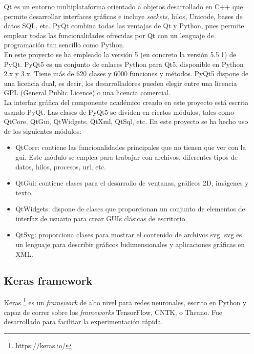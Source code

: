 Qt es un entorno multiplataforma orientado a objetos desarrollado en C++ que permite desarrollar interfaces gráficas e incluye \textit{sockets}, hilos, Unicode, bases de datos SQL, etc. PyQt combina todas las ventajas de Qt y Python, pues permite emplear todas las funcionalidades ofrecidas por Qt con un lenguaje de programación tan sencillo como Python.\\

En este proyecto se ha empleado la versión 5 (en concreto la versión 5.5.1) de PyQt. PyQt5 es un conjunto de enlaces Python para Qt5, disponible en Python 2.x y 3.x. Tiene más de 620 clases y 6000 funciones y métodos. PyQt5 dispone de una licencia dual, es decir, los desarrolladores pueden elegir entre una licencia GPL (General Public Licence) o una licencia comercial. \\

La interfaz gráfica del componente académico creado en este proyecto está escrita usando PyQt. Las clases de PyQt5 se dividen en ciertos módulos, tales como QtCore, QtGui, QtWidgets, QtXml, QtSql, etc. En este proyecto se ha hecho uso de los siguientes módulos:

\begin{itemize}
\item QtCore: contiene las funcionalidades principales que no tienen que ver con la \acrshort{gui}. Este módulo se emplea para trabajar con archivos, diferentes tipos de datos, hilos, procesos, url, etc.

\item QtGui: contiene clases para el desarrollo de ventanas, gráficos 2D, imágenes y texto.

\item QtWidgets: dispone de clases que proporcionan un conjunto de elementos de interfaz de usuario para crear GUIs clásicas de escritorio. 

\item QtSvg: proporciona clases para mostrar el contenido de archivos \acrfull{svg}. \acrshort{svg} es un lenguaje para describir gráficos bidimensionales y aplicaciones gráficas en XML.
\end{itemize}


\subsection{Keras framework}

Keras \footnote{https://keras.io/} es un \textit{framework} de alto nivel para redes neuronales, escrito en Python y capaz de correr sobre los \textit{frameworks} TensorFlow, CNTK, o Theano. Fue desarrollado para facilitar la experimentación rápida. \\

